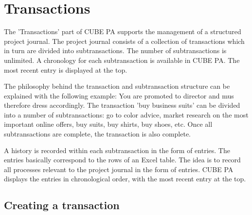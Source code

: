 
\clearpage
\section{Transactions}

The 'Transactions' part of CUBE PA supports the management of a structured project journal. The project journal consists of a collection of transactions which in turn are divided into subtransactions. The number of subtransactions is unlimited. A chronology for each subtransaction is available in CUBE PA. The most recent entry is displayed at the top.

\vspace{\baselineskip}

The philosophy behind the transaction and subtransaction structure can be explained with the following example: You are promoted to director and mus therefore dress accordingly. The transaction 'buy business suits' can be divided into a number of subtransactions: go to color advice, market research on the most important online offers, buy suits, buy shirts, buy shoes, etc. Once all subtransactions are complete, the transaction is also complete.

\vspace{\baselineskip}

A history is recorded within each subtransaction in the form of entries. The entries basically correspond to the rows of an Excel table. The idea is to record all processes relevant to the project journal in the form of entries. CUBE PA displays the entries in chronological order, with the most recent entry at the top.

\subsection{Creating a transaction}

